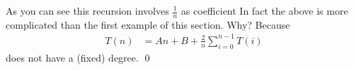 

As you can see this recursion involves $\frac{1}{n}$ as coefficient
In fact the above is more complicated than the first example of this section.
Why? Because
\begin{align*}
T(n)
&= An + B + \frac{2}{n}\sum_{i=0}^{n-1} T(i)
\end{align*}
does not have a (fixed) degree.
\qed







\begin{comment}
Can we find the closed form using an ad-hoc method?
\begin{align*}
a_n
&= \frac{1}{n} a_{n-1} + n \\
&= \frac{1}{n} \left( \frac{1}{n-1} a_{n-2} + n - 1 \right) + n \\
&= \frac{1}{n(n-1)} a_{n-2} + \frac{n - 1}{n} + n \\
&= \frac{1}{n(n-1)}
   \left(
     \frac{1}{n-2} a_{n-3} + n - 2
   \right)
   + \frac{n - 1}{n} + n \\
&= \frac{1}{n(n-1)(n-2)} a_{n-3}
   + \frac{n - 2}{n(n-1)} 
   + \frac{n - 1}{n} + n \\
&= \frac{1}{n(n-1)(n-2)}
   \left(
     \frac{1}{n-3} a_{n-4} + n - 3 
   \right)
   + \frac{n - 2}{n(n-1)} 
   + \frac{n - 1}{n} + n \\
&= \frac{1}{n(n-1)(n-2)(n-3)} a_{n-4}
   + \frac{n - 3}{n(n-1)(n-2)} 
   + \frac{n - 2}{n(n-1)} 
   + \frac{n - 1}{n} + n \\
&= \ldots \\
&= \frac{1}{n(n-1)(n-2)(n-3)\cdots(1)} a_{0}
\\
   &\hspace{1cm} + \frac{n - 3}{n(n-1)(n-2)} 
   + \frac{n - 2}{n(n-1)} 
   + \frac{n - 1}{n} + n \\
\end{align*}
\end{comment}












